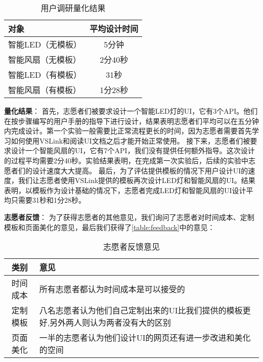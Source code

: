 \begin{table}[htbp]
    \caption{用户调研量化结果}
	\label{table:feedback_quant}
	\begin{center}
		\begin{tabular}{|l|c|}
			\hline
			对象 & 平均设计时间 \\ \hline
			智能LED（无模板） & 5分钟 \\ \hline
			智能风扇（无模板） & 2分40秒 \\ \hline
			智能LED（有模板） & 31秒 \\ \hline
			智能风扇（有模板） & 1分28秒 \\ \hline
		\end{tabular}
	\end{center}
\end{table}
\textbf{量化结果}： 
首先，志愿者们被要求设计一个智能LED灯的UI，它有3个API。他们在按步骤编写的用户手册的指导下进行设计，结果表明志愿者们平均可以在五分钟内完成设计。第一个实验一般需要比正常流程更长的时间，因为志愿者需要首先学习如何使用VSLink和阅读UI文档之后才能开始正常使用。
接下来，志愿者们被要求设计一个智能风扇的UI，它有7个API，我们没有提供任何额外指导。这次设计的过程平均需要2分40秒。实验结果表明，在完成第一次实验后，后续的实验中志愿者们的设计速度大大提高。
最后，为了评估提供模板的情况下用户设计UI的速度，我们让志愿者使用VSLink提供的模板再次设计LED灯和智能风扇的UI。结果表明，以模板作为设计基础的情况下，志愿者完成LED灯和智能风扇的UI设计平均只需要31秒和1分28秒。

\textbf{志愿者反馈}：
为了获得志愿者的其他意见，我们询问了志愿者对时间成本、定制模板和页面美化的意见，最后我们获得了\autoref{table:feedback}中的意见：
\begin{table}[htbp]
    \caption{志愿者反馈意见}
	\label{table:feedback}
    \begin{tabularx}{\linewidth}{|c|X|}
        \hline
        类别 & 意见 \\ \hline
        时间成本 & 所有志愿者都认为时间成本是可以接受的 \\ \hline
        定制模板 & 八名志愿者认为他们自己定制出来的UI比我们提供的模板更好,另外两人则认为两者没有大的区别 \\ \hline
        页面美化 & 一半的志愿者认为他们设计UI的网页还有进一步改进和美化的空间 \\ \hline
    \end{tabularx}
\end{table}


